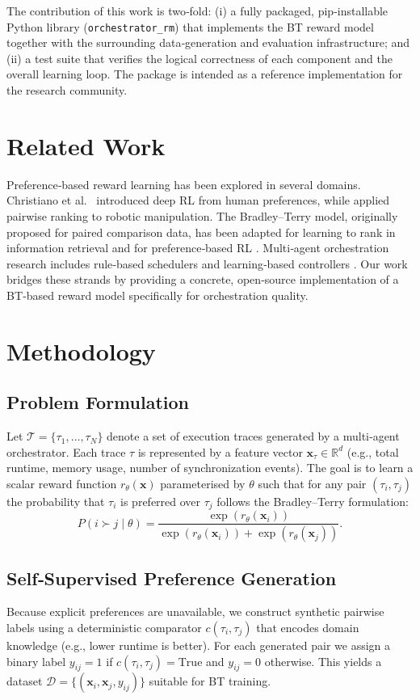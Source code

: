 \documentclass[11pt,a4paper]{article}
\begin{document}
The contribution of this work is two‑fold: (i) a fully packaged, pip‑installable Python library (\texttt{orchestrator\_rm}) that implements the BT reward model together with the surrounding data‑generation and evaluation infrastructure; and (ii) a test suite that verifies the logical correctness of each component and the overall learning loop.  The package is intended as a reference implementation for the research community.

\section{Related Work}
Preference‑based reward learning has been explored in several domains.  Christiano et al.~\cite{christiano2017deep} introduced deep RL from human preferences, while \citet{lee2021preference} applied pairwise ranking to robotic manipulation.  The Bradley–Terry model, originally proposed for paired comparison data, has been adapted for learning to rank in information retrieval \cite{burges2005learning} and for preference‑based RL \cite{lee2020preference}.  Multi‑agent orchestration research includes rule‑based schedulers \cite{grosu2005scheduling} and learning‑based controllers \cite{zhang2020learning}.  Our work bridges these strands by providing a concrete, open‑source implementation of a BT‑based reward model specifically for orchestration quality.

\section{Methodology}
\subsection{Problem Formulation}
Let $\mathcal{T} = \{ \tau_1, \dots, \tau_N \}$ denote a set of execution traces generated by a multi‑agent orchestrator.  Each trace $\tau$ is represented by a feature vector $\mathbf{x}_\tau \in \mathbb{R}^d$ (e.g., total runtime, memory usage, number of synchronization events).  The goal is to learn a scalar reward function $r_\theta(\mathbf{x})$ parameterised by $\theta$ such that for any pair $(\tau_i, \tau_j)$ the probability that $\tau_i$ is preferred over $\tau_j$ follows the Bradley–Terry formulation:
\[
P(i \succ j \mid \theta) = \frac{\exp(r_\theta(\mathbf{x}_i))}{\exp(r_\theta(\mathbf{x}_i)) + \exp(r_\theta(\mathbf{x}_j))}.
\]

\subsection{Self‑Supervised Preference Generation}
Because explicit preferences are unavailable, we construct synthetic pairwise labels using a deterministic comparator $c(\tau_i, \tau_j)$ that encodes domain knowledge (e.g., lower runtime is better).  For each generated pair we assign a binary label $y_{ij}=1$ if $c(\tau_i,\tau_j)=\text{True}$ and $y_{ij}=0$ otherwise.  This yields a dataset $\mathcal{D} = \{(\mathbf{x}_i,\mathbf{x}_j, y_{ij})\}$ suitable for BT training.
\end{document}
